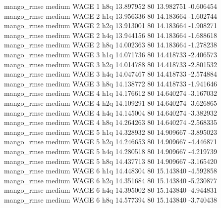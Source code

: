        mango_rmse     medium     WAGE                 1                  h8q 13.897952 80      13.982751          -0.606454
       mango_rmse     medium     WAGE                 2                  h1q 13.956336 80      14.183664          -1.602744
       mango_rmse     medium     WAGE                 2                  h2q 13.913001 80      14.183664          -1.908271
       mango_rmse     medium     WAGE                 2                  h4q 13.944156 80      14.183664          -1.688618
       mango_rmse     medium     WAGE                 2                  h8q 14.002363 80      14.183664          -1.278238
       mango_rmse     medium     WAGE                 3                  h1q 14.071736 80      14.418733          -2.406573
       mango_rmse     medium     WAGE                 3                  h2q 14.014788 80      14.418733          -2.801532
       mango_rmse     medium     WAGE                 3                  h4q 14.047467 80      14.418733          -2.574884
       mango_rmse     medium     WAGE                 3                  h8q 14.138772 80      14.418733          -1.941646
       mango_rmse     medium     WAGE                 4                  h1q 14.176612 80      14.640274          -3.167032
       mango_rmse     medium     WAGE                 4                  h2q 14.109291 80      14.640274          -3.626865
       mango_rmse     medium     WAGE                 4                  h4q 14.145004 80      14.640274          -3.382932
       mango_rmse     medium     WAGE                 4                  h8q 14.264263 80      14.640274          -2.568335
       mango_rmse     medium     WAGE                 5                  h1q 14.328932 80      14.909667          -3.895023
       mango_rmse     medium     WAGE                 5                  h2q 14.246653 80      14.909667          -4.446871
       mango_rmse     medium     WAGE                 5                  h4q 14.280518 80      14.909667          -4.219739
       mango_rmse     medium     WAGE                 5                  h8q 14.437713 80      14.909667          -3.165420
       mango_rmse     medium     WAGE                 6                  h1q 14.448304 80      15.143840          -4.592858
       mango_rmse     medium     WAGE                 6                  h2q 14.351684 80      15.143840          -5.230877
       mango_rmse     medium     WAGE                 6                  h4q 14.395002 80      15.143840          -4.944831
       mango_rmse     medium     WAGE                 6                  h8q 14.577394 80      15.143840          -3.740438
